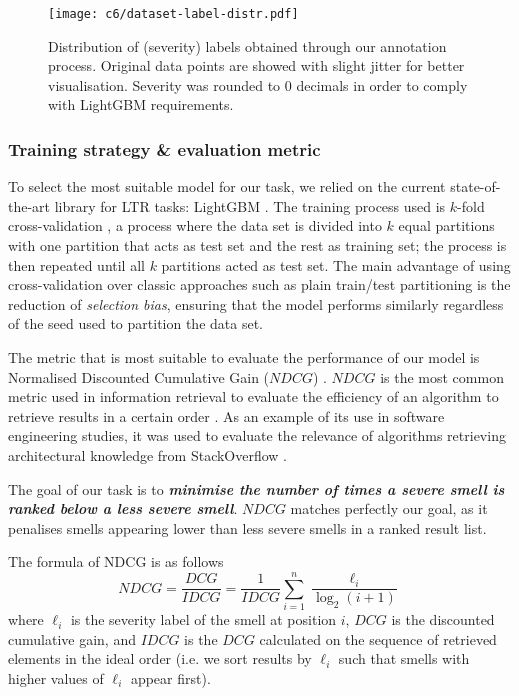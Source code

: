 \begin{figure}
    \centering
    \texttt{[image: c6/dataset-label-distr.pdf]}
    \caption{Distribution of (severity) labels obtained through our annotation process. Original data points are showed with slight jitter for better visualisation. Severity was rounded to 0 decimals in order to comply with LightGBM requirements.}\label{c6:fig:dataset-label-distr}
\end{figure}

\subsubsection{Training strategy \& evaluation metric}\label{c6:sec:perf-metric}
To select the most suitable model for our task, we relied on the current state-of-the-art library for LTR tasks: LightGBM \cite{Ke2017}.
The training process used is $k$-fold cross-validation \cite{Stone1974}, a process where the data set is divided into $k$ equal partitions with one partition that acts as test set and the rest as training set; the process is then repeated until all $k$ partitions acted as test set.
The main advantage of using cross-validation over classic approaches such as plain train/test partitioning is the reduction of \emph{selection bias}, ensuring that the model performs similarly regardless of the seed used to partition the data set.

The metric that is most suitable to evaluate the performance of our model is Normalised Discounted Cumulative Gain ($NDCG$) \cite{Jarvelin2002}. 
$NDCG$ is the most common metric used in information retrieval to evaluate the efficiency of an algorithm to retrieve results in a certain order \cite{Wang2018}.
As an example of its use in software engineering studies, it was used to evaluate the relevance of algorithms retrieving architectural knowledge from StackOverflow \cite{Soliman2018}.

The goal of our task is to \textit{\textbf{minimise the number of times a severe smell is ranked below a less severe smell}}.
$NDCG$ matches perfectly our goal, as it penalises smells appearing lower than less severe smells in a ranked result list.

The formula of NDCG is as follows
$$NDCG = \frac{DCG}{IDCG} = \frac{1}{IDCG}\sum_{i=1}^n\frac{\ell_i}{\log_2(i+1)}$$
where $\ell_i$ is the severity label of the smell at position $i$, $DCG$ is the discounted cumulative gain, and $IDCG$ is the $DCG$ calculated on the sequence of retrieved elements in the ideal order (i.e. we sort results by $\ell_i$ such that smells with higher values of $\ell_i$ appear first).

